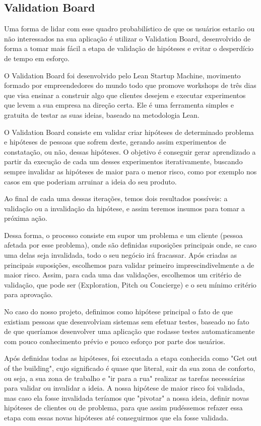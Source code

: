 \subsection{Validation Board}\label{sec:LABEL_CHP_1_SEC_B}
Uma forma de lidar com esse quadro probabilístico de que os usuários estarão ou não interessados na sua aplicação é utilizar o Validation Board, desenvolvido de forma a tomar mais fácil a etapa de validação de hipóteses e evitar o desperdício de tempo em esforço.

O Validation Board foi desenvolvido pelo Lean Startup Machine, movimento formado por empreendedores do mundo todo que promove workshops de três dias que visa ensinar a construir algo que clientes desejem e executar experimentos que levem a sua empresa na direção certa. Ele é uma ferramenta simples e gratuita de testar as suas ideias, baseado na metodologia Lean.

O Validation Board consiste em validar criar hipóteses de determinado problema e hipóteses de pessoas que sofrem deste, gerando assim experimentos de constatação, ou não, dessas hipóteses. O objetivo é conseguir gerar aprendizado a partir da execução de cada um desses experimentos iterativamente, buscando sempre invalidar as hipóteses de maior para o menor risco, como por exemplo nos casos em que poderiam arruinar a ideia do seu produto.

Ao final de cada uma dessas iterações, temos dois resultados possíveis: a validação ou a invalidação da hipótese, e assim teremos insumos para tomar a próxima ação.

Dessa forma, o processo consiste em supor um problema e um cliente (pessoa afetada por esse problema), onde são definidas suposições principais onde, se caso uma delas seja invalidada, todo o seu negócio irá fracassar. Após criadas as principais suposições, escolhemos para validar primeiro imprescindivelmente a de maior risco. Assim, para cada uma das validações, escolhemos um critério de validação, que pode ser (Exploration, Pitch ou Concierge) e o seu mínimo critério para aprovação.

No caso do nosso projeto, definimos como hipótese principal o fato de que existiam pessoas que desenvolviam sistemas sem efetuar testes, baseado no fato de que queríamos desenvolver uma aplicação que rodasse testes automaticamente com pouco conhecimento prévio e pouco esforço por parte dos usuários.

Após definidas todas as hipóteses, foi executada a etapa conhecida como "Get out of the building", cujo significado é quase que literal, sair da sua zona de conforto, ou seja, a sua zona de trabalho e "ir para a rua" realizar as tarefas necessárias para validar ou invalidar a ideia. A nossa hipótese de maior risco foi validada, mas caso ela fosse invalidada teríamos que "pivotar" a nossa ideia, definir novas hipóteses de clientes ou de problema, para que assim pudéssemos refazer essa etapa com essas novas hipóteses até conseguirmos que ela fosse validada.


